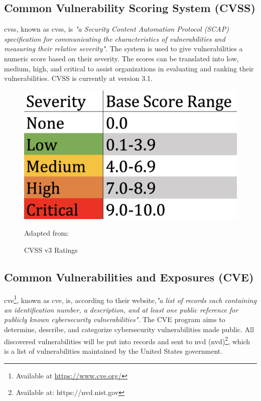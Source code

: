 \subsection{Common Vulnerability Scoring System (CVSS)}
\acrlong{cvss}, known as \acrshort{cvss}, is \textit{"a Security Content Automation Protocol (SCAP) specification for communicating the characteristics of vulnerabilities and measuring their relative severity"}\cite{nistCVSS}. The system is used to give vulnerabilities a numeric score based on their severity. The scores can be translated into low, medium, high, and critical to assist organizations in evaluating and ranking their vulnerabilities. CVSS is currently at version 3.1. \cite{CVSS}

\begin{figure}[H]
    \centering
    \includegraphics[scale=0.3]{Images/CVSS.png}
    \caption{CVSS v3 Ratings} Adapted from:\cite{cvssrating}
    \label{fig:CVSS v3 Ratings}
\end{figure}

\subsection{Common Vulnerabilities and Exposures (CVE)}
\label{Common Vulnerabilities and Exposures}
\acrlong{cve}\footnote{Available at \url{https://www.cve.org/}}, known as \acrshort{cve}, is, according to their website,\textit{"a list of records each containing an identification number, a description, and at least one public reference for publicly known cybersecurity vulnerabilities"}\cite{CVE}. The CVE program aims to determine, describe, and categorize cybersecurity vulnerabilities made public. All discovered vulnerabilities will be put into records and sent to \acrlong{nvd} (\acrshort{nvd})\footnote{Available at: https://nvd.nist.gov}, which is a list of vulnerabilities maintained by the United States government.

